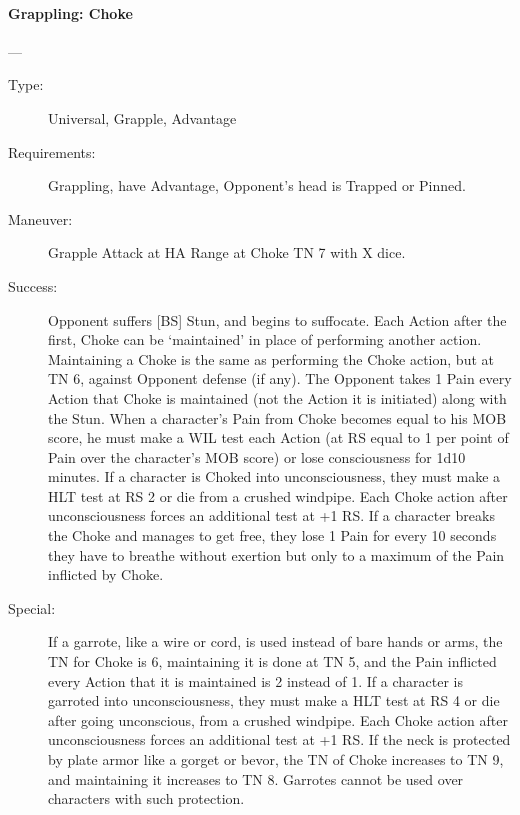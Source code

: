 \documentclass[oneside,11pt,english]{book}
\begin{document}
\paragraph{\large\label{man:Grappling: Choke}Grappling: Choke}---\quad{\large[X]}
\vspace{-10pt}\begin{description} 
\item [Type:] Universal, Grapple, Advantage 
\item [Requirements:] Grappling, have Advantage, Opponent's head is Trapped or Pinned. 
\item [Maneuver:] Grapple Attack at HA Range at Choke TN 7 with X dice. 
\item [Success:] Opponent suffers [BS] Stun, and begins to suffocate. 
Each Action after the first, Choke can be ‘maintained’ in place of performing another action. Maintaining 
a Choke is the same as performing the Choke action, but at TN 6, against Opponent defense (if any). The 
Opponent takes 1 Pain every Action that Choke is maintained (not the Action it is initiated) along with 
the Stun. 
When a character's Pain from Choke becomes equal to his MOB score, he must make a WIL test each 
Action (at RS equal to 1 per point of Pain over the character's MOB score) or lose consciousness for 1d10 
minutes. If a character is Choked into unconsciousness, they must make a HLT test at RS 2 or die from a 
crushed windpipe. Each Choke action after unconsciousness forces an additional test at +1 RS. 
If a character breaks the Choke and manages to get free, they lose 1 Pain for every 10 seconds they have 
to breathe without exertion but only to a maximum of the Pain inflicted by Choke. 
\item [Special:] If a garrote, like a wire or cord, is used instead of bare hands or arms, the TN for Choke is 6, 
maintaining it is done at TN 5, and the Pain inflicted every Action that it is maintained is 2 instead of 1. If 
a character is garroted into unconsciousness, they must make a HLT test at RS 4 or die after going 
unconscious, from a crushed windpipe. Each Choke action after unconsciousness forces an additional test 
at +1 RS.
If the neck is protected by plate armor like a gorget or bevor, the TN of Choke increases to TN 9, and 
maintaining it increases to TN 8. Garrotes cannot be used over characters with such protection. 
\end{description}
\end{document}
